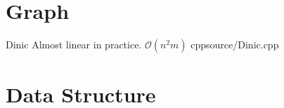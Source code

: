 \documentclass[landscape, 10pt, a4paper, oneside, twocolumn]{extarticle}
\begin{document}
\maketitlepage



\section{Graph}

\Algorithm
{Dinic}
{Almost linear in practice.}
{$\mathcal{O}(n^{2}m)$}
{cpp}{source/Dinic.cpp}


\section{Data Structure}



\end{document}
